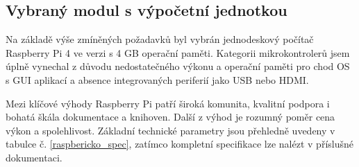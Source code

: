 \subsection{Vybraný modul s výpočetní jednotkou}
Na základě výše zmíněných požadavků byl vybrán jednodeskový počítač Raspberry Pi 4 ve verzi s 4 GB operační paměti. Kategorii mikrokontrolerů jsem úplně vynechal z důvodu nedostatečného výkonu a operační paměti pro chod OS s GUI aplikací a absence integrovaných periferií jako USB nebo HDMI. 

Mezi klíčové výhody Raspberry Pi patří široká komunita, kvalitní podpora i bohatá škála dokumentace a knihoven. Další z výhod je rozumný poměr cena výkon a spolehlivost. Základní technické parametry jsou přehledně uvedeny v tabulce č. \ref{raspbericko_spec}, zatímco kompletní specifikace lze nalézt v příslušné dokumentaci. \cite{Raspberry pi}



